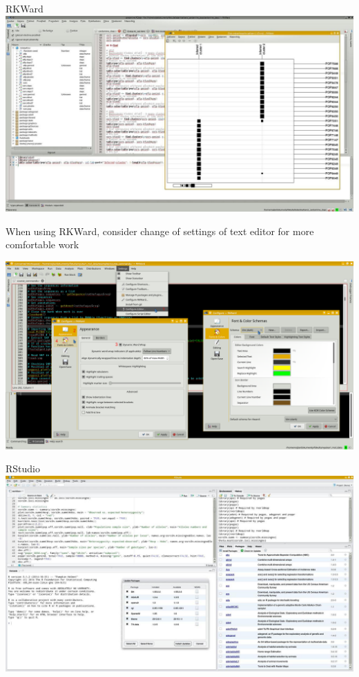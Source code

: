 \documentclass[compress, ucs, xelatex, 11pt, xcolor=svgnames,
  hyperref={
    bookmarks=true,
    unicode=true,
    colorlinks=true,
    pdftitle={Molecular data in R},
    plainpages=false,
    pdfauthor={Vojtech Zeisek},
    pdfsubject={Course about phylogeny and evolution in R},
    pdfcreator={XeLaTeX},
    pdfkeywords={R, evolution, phylogeny, molecular data},
    linkcolor=Tomato,
    anchorcolor=SaddleBrown,
    citecolor=Goldenrod,
    filecolor=DarkMagenta,
    menucolor=Sienna,
    urlcolor=DarkTurquoise,
    pdftex},
  url={hyphens, lowtilde} %
  ]{beamer}
\begin{document}
\begin{frame}{RKWard}
  \includegraphics[width=\textwidth]{rkward.jpg}
\end{frame}

\begin{frame}{When using RKWard, consider change of settings of text editor for more comfortable work}
  \begin{center}
    \includegraphics[width=\textwidth-0.25cm]{rkward_settings.png}
  \end{center}
\end{frame}

\begin{frame}{RStudio}
  \includegraphics[width=\textwidth]{rstudio.jpg}
\end{frame}
\end{document}
